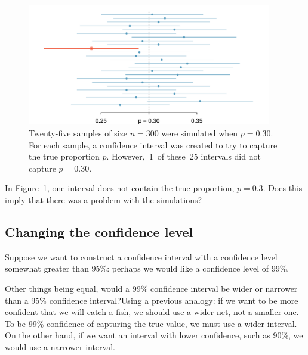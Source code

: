 \begin{figure}[hht]
\centering
\includegraphics[width=0.95\textwidth]{ch_foundations_for_inf/figures/95PercentConfidenceInterval/95PercentConfidenceInterval}
\caption{Twenty-five samples of size $n=300$ were simulated when $p = 0.30$. For each sample, a confidence interval was created to try to capture the true proportion $p$. However,~1~of these~25 intervals did not capture $p = 0.30$.}
\label{95PercentConfidenceInterval}
\end{figure}

\begin{exercisewrap}
\begin{nexercise}
In Figure~\ref{95PercentConfidenceInterval}, one interval does not contain the true proportion, $p = 0.3$. Does this imply that there was a problem with the simulations?\footnotemark
\end{nexercise}
\end{exercisewrap}

\textA{\newpage}
\subsection{Changing the confidence level}
\label{changingTheConfidenceLevelSection}


Suppose we want to construct a confidence interval with a confidence level somewhat greater than 95\%: perhaps we would like a confidence level of 99\%. 

\begin{examplewrap}
\begin{nexample}{Other things being equal, would a 99\% confidence interval be wider or narrower than a 95\% confidence interval?}Using a previous analogy: if we want to be more confident that we will catch a fish, we should use a wider net, not a smaller one. To be 99\% confidence of capturing the true value, we must use a wider interval. On the other hand, if we want an interval with lower confidence, such as 90\%, we would use a narrower interval.
\end{nexample}
\end{examplewrap}

